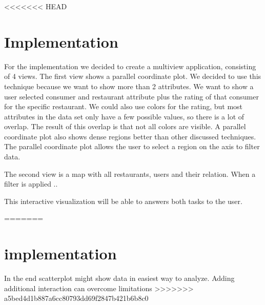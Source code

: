 <<<<<<< HEAD
\section{Implementation}\label{sec:implemenation}

For the implementation we decided to create a multiview application, consisting of 4 views.
The first view shows a parallel coordinate plot.
We decided to use this technique because we want to show more than 2 attributes.
We want to show a user selected consumer and restaurant attribute plus the rating of that consumer for the specific restaurant.
We could also use colors for the rating, but most attributes in the data set only have a few possible values, so there is a lot of overlap.
The result of this overlap is that not all colors are visible.
A parallel coordinate plot also shows dense regions better than other discussed techniques.
The parallel coordinate plot allows the user to select a region on the axis to filter data.

The second view is a map with all restaurants, users and their relation.
When a filter is applied ..

This interactive visualization will be able to answers both tasks to the user.



=======
\section{implementation}\label{sec:implemenation}
In the end scatterplot might show data in easiest way to analyze. Adding additional interaction can overcome limitations
>>>>>>> a5bed4d1b887a6cc80793dd69f2847b421b6b8c0

